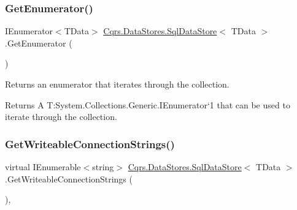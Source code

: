 \mbox{\label{classCqrs_1_1DataStores_1_1SqlDataStore_a774a0a12d6a89479cf25191916f51c47}} 
\subsubsection{\texorpdfstring{Get\+Enumerator()}{GetEnumerator()}}
{\footnotesize\ttfamily I\+Enumerator$<$T\+Data$>$ \hyperlink{classCqrs_1_1DataStores_1_1SqlDataStore}{Cqrs.\+Data\+Stores.\+Sql\+Data\+Store}$<$ T\+Data $>$.Get\+Enumerator (\begin{DoxyParamCaption}{ }\end{DoxyParamCaption})}



Returns an enumerator that iterates through the collection. 

\begin{DoxyReturn}{Returns}
A T\+:\+System.\+Collections.\+Generic.\+I\+Enumerator`1 that can be used to iterate through the collection. 
\end{DoxyReturn}
\mbox{\label{classCqrs_1_1DataStores_1_1SqlDataStore_a091f7762de79cb2d488c2baafbb71476}} 
\subsubsection{\texorpdfstring{Get\+Writeable\+Connection\+Strings()}{GetWriteableConnectionStrings()}}
{\footnotesize\ttfamily virtual I\+Enumerable$<$string$>$ \hyperlink{classCqrs_1_1DataStores_1_1SqlDataStore}{Cqrs.\+Data\+Stores.\+Sql\+Data\+Store}$<$ T\+Data $>$.Get\+Writeable\+Connection\+Strings (\begin{DoxyParamCaption}{ }\end{DoxyParamCaption})\hspace{0.3cm}{\ttfamily [protected]}, {\ttfamily [virtual]}}



